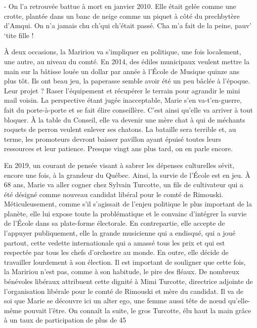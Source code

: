 - On l’a retrouvée battue à mort en janvier 2010. Elle était gelée comme une crotte, plantée dans un banc de neige comme un piquet à côté du prechbytère d’Amqui. On n’a jamais chu ch’qui ch’était passé. Cha m’a fait de la peine, pauv’ ‘tite fille !

À deux occasions, la Maririou va s’impliquer en politique, une fois localement, une autre, au niveau du comté. En 2014, des édiles municipaux veulent mettre la main sur la bâtisse louée un dollar par année à l’École de Musique quinze ans plus tôt. Ils ont beau jeu, la paperasse semble avoir été un peu bâclée à l’époque. Leur projet ? Raser l’équipement et récupérer le terrain pour agrandir le mini mail voisin. La perspective étant jugée inacceptable, Marie s’en va-t’en-guerre, fait du porte-à-porte et se fait élire conseillère. C’est ainsi qu’elle va arriver à tout bloquer. À la table du Conseil, elle va devenir une mère chat à qui de méchants roquets de perron veulent enlever ses chatons. La bataille sera terrible et, au terme, les promoteurs devront baisser pavillon ayant épuisé toutes leurs ressources et leur patience. Presque vingt ans plus tard, on en parle encore.

En 2019, un courant de pensée visant à sabrer les dépenses culturelles sévit, encore une fois, à la grandeur du Québec. Ainsi, la survie de l’École est en jeu. À 68 ans, Marie va aller cogner chez Sylvain Turcotte, un fils de cultivateur qui a été désigné comme nouveau candidat libéral pour le comté de Rimouski. Méticuleusement, comme s’il s’agissait de l’enjeu politique le plus important de la planète, elle lui expose toute la problématique et le convainc d’intégrer la survie de l’École dans sa plate-forme électorale. En contrepartie, elle accepte de l’appuyer publiquement, elle la grande musicienne qui a endisqué, qui a joué partout, cette vedette internationale qui a amassé tous les prix et qui est respectée par tous les chefs d’orchestre au monde. En outre, elle décide de travailler lourdement à son élection. Il est important de souligner que cette fois, la Maririou n’est pas, comme à son habitude, le pire des fléaux. De nombreux bénévoles libéraux attribuent cette dignité à Mimi Turcotte, directrice adjointe de l’organisation libérale pour le comté de Rimouski et mère du candidat. Il va de soi que Marie se découvre ici un alter ego, une femme aussi tête de nœud qu’elle-même pouvait l’être. On connaît la suite, le gros Turcotte, élu haut la main grâce à un taux de participation de plus de 45 %

